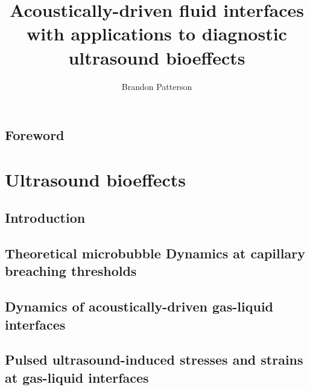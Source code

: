\documentclass{./tex/thesis-umich}
\title{Acoustically-driven fluid interfaces with applications to diagnostic ultrasound bioeffects}
\author{Brandon Patterson}
\begin{document}
\chapter*{Foreword} \label{ch:foreword}



%
\acresetall

\part{Ultrasound bioeffects} \label{part:ultrasound_bioeffects}
%


\chapter{Introduction} \label{ch:Introduction}

% 

\chapter{Theoretical microbubble Dynamics at capillary breaching thresholds}   \label{ch:usbe_bubble}%
%
%

\acresetall


\chapter{Dynamics of acoustically-driven gas-liquid interfaces} \label{ch:usbe_lung}%

% 
% 
% 
% 
% 
% 


\acresetall
\chapter{Pulsed ultrasound-induced stresses and strains at gas-liquid interfaces} \label{ch:usbe_lung_bio}%

\end{document}
